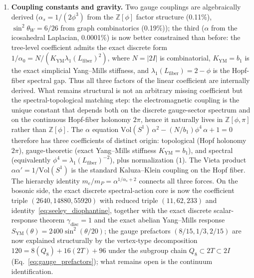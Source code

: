\documentclass[12pt,a4paper]{article}
\theoremstyle{definition}
\begin{document}
\begin{enumerate}
\item \textbf{Coupling constants and gravity.}  Two gauge couplings are algebraically derived ($\alpha_s = 1/(2\phi^3)$ from the $\mathbb{Z}[\phi]$ factor structure (0.11\%), $\sin^2\theta_W = 6/26$ from graph combinatorics (0.19\%)); the third ($\alpha$ from the icosahedral Laplacian, 0.0001\%) is now better constrained than before: the tree-level coefficient admits the exact discrete form $1/\alpha_0 = N/(K_{\mathrm{YM}}\lambda_1(L_{\mathrm{fiber}})^2)$, where $N=|2I|$ is combinatorial, $K_{\mathrm{YM}} = b_1$ is the exact simplicial Yang--Mills stiffness, and $\lambda_1(L_{\mathrm{fiber}})=2-\phi$ is the Hopf-fiber spectral gap.  Thus all three factors of the linear coefficient are internally derived.  What remains structural is not an arbitrary missing coefficient but the spectral-topological matching step: the electromagnetic coupling is the unique constant that depends both on the discrete gauge-sector spectrum and on the continuous Hopf-fiber holonomy $2\pi$, hence it naturally lives in $\mathbb{Z}[\phi,\pi]$ rather than $\mathbb{Z}[\phi]$.  The $\alpha$ equation $\text{Vol}(S^1)\,\alpha^2 - (N/b_1)\phi^4\,\alpha + 1 = 0$ therefore has three coefficients of distinct origin: topological (Hopf holonomy $2\pi$), gauge-theoretic (exact Yang--Mills stiffness $K_{\mathrm{YM}} = b_1$), and spectral (equivalently $\phi^4 = \lambda_1(L_{\mathrm{fiber}})^{-2}$), plus normalization ($1$).  The Vieta product $\alpha\alpha' = 1/\text{Vol}(S^1)$ is the standard Kaluza--Klein coupling on the Hopf fiber.  The hierarchy identity $m_e/m_P = \alpha^{1/\alpha_s+2}$ connects all three forces.  On the bosonic side, the exact discrete spectral-action core is now the coefficient triple $(2640,14880,55920)$ with reduced triple $(11,62,233)$ and identity~\eqref{eq:seeley_diophantine}, together with the exact discrete scalar-response theorem $\gamma_{\mathrm{disc}} = 1$ and the exact abelian Yang--Mills response $S_{\mathrm{YM}}(\theta)=2400\sin^2(\theta/20)$; the gauge prefactors $(8/15, 1/3, 2/15)$ are now explained structurally by the vertex-type decomposition $120 = 8(Q_8) + 16(2T) + 96$ under the subgroup chain $Q_8 \subset 2T \subset 2I$ (Eq.~\ref{eq:gauge_prefactors}); what remains open is the continuum identification.


\end{enumerate}
\end{document}
